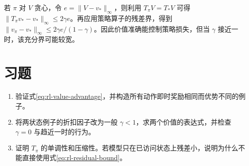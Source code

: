 若 $\pi$ 对 $V$ 贪心，令 $e=\|V-v_*\|_\infty$，则利用 $T_\pi V=T_*V$ 可得 $\|T_\pi v_*-v_*\|_\infty\leq2\gamma e$。再应用策略算子的残差界，得到 $\|v_\pi-v_*\|_\infty\leq2\gamma e/(1-\gamma)$。因此价值准确能控制策略损失，但当 $\gamma$ 接近一时，该充分界可能较宽。

\section{习题}
\begin{enumerate}
\item 验证式\eqref{eq:rl-value-advantage}，并构造所有动作即时奖励相同而优势不同的例子。
\item 将两状态例子的折扣因子改为一般 $\gamma<1$，求两个价值的表达式，并检查 $\gamma=0$ 与趋近一时的行为。
\item 证明 $T_\pi$ 的单调性和压缩性。若模型只在已访问状态上残差小，说明为什么不能直接使用式\eqref{eq:rl-residual-bound}。
\end{enumerate}




